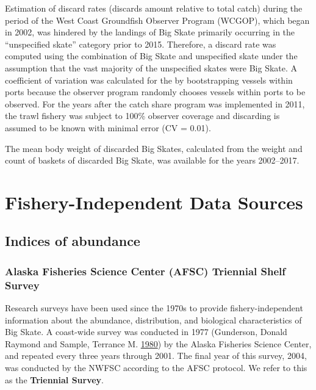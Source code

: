 \documentclass[12pt,]{article}
\begin{document}
Estimation of discard rates (discards amount relative to total catch)
during the period of the West Coast Groundfish Observer Program (WCGOP),
which began in 2002, was hindered by the landings of Big Skate primarily
occurring in the ``unspecified skate'' category prior to 2015.
Therefore, a discard rate was computed using the combination of Big
Skate and unspecified skate under the assumption that the vast majority
of the unspecified skates were Big Skate. A coefficient of variation was
calculated for the by bootstrapping vessels within ports because the
observer program randomly chooses vessels within ports to be observed.
For the years after the catch share program was implemented in 2011, the
trawl fishery was subject to 100\% observer coverage and discarding is
assumed to be known with minimal error (CV = 0.01).

The mean body weight of discarded Big Skates, calculated from the weight
and count of baskets of discarded Big Skate, was available for the years
2002--2017.

\hypertarget{fishery-independent-data-sources}{%
\section{Fishery-Independent Data
Sources}\label{fishery-independent-data-sources}}

\hypertarget{indices-of-abundance}{%
\subsection{Indices of abundance}\label{indices-of-abundance}}

\hypertarget{alaska-fisheries-science-center-afsc-triennial-shelf-survey}{%
\subsubsection{Alaska Fisheries Science Center (AFSC) Triennial Shelf
Survey}\label{alaska-fisheries-science-center-afsc-triennial-shelf-survey}}

Research surveys have been used since the 1970s to provide
fishery-independent information about the abundance, distribution, and
biological characteristics of Big Skate. A coast-wide survey was
conducted in 1977 (Gunderson, Donald Raymond and Sample, Terrance M.
\protect\hyperlink{ref-Gunderson1980}{1980}) by the Alaska Fisheries
Science Center, and repeated every three years through 2001. The final
year of this survey, 2004, was conducted by the NWFSC according to the
AFSC protocol. We refer to this as the \textbf{Triennial Survey}.
\end{document}
